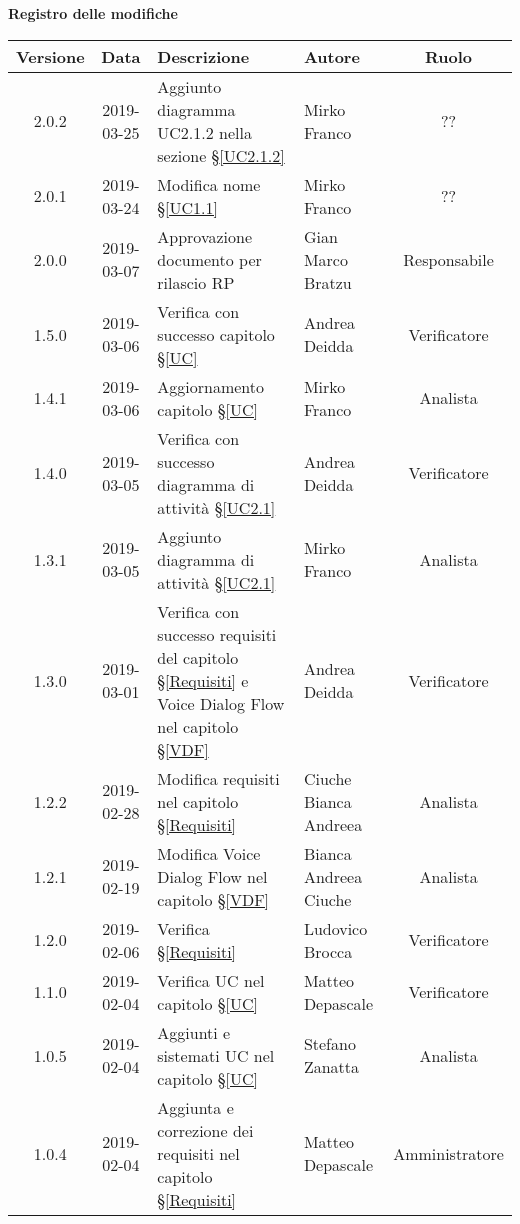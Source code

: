 	\begin{center}
		\textbf{Registro delle modifiche}
	\end{center}
	\begin{center}
		\begin{tabularx}{\textwidth}{|c|c|X|X|c|}
			\hline
			\textbf{Versione} & \textbf{Data} & \textbf{Descrizione} & \textbf{Autore} & \textbf{Ruolo} \\
			\hline
			2.0.2 & 2019-03-25 & Aggiunto diagramma UC2.1.2 nella sezione \S\ref{UC2.1.2} & Mirko Franco & ?? \\
			\hline
			2.0.1 & 2019-03-24 & Modifica nome \S\ref{UC1.1} & Mirko Franco & ?? \\
			\hline
			2.0.0 & 2019-03-07 & Approvazione documento per rilascio RP & Gian Marco Bratzu & Responsabile \\
			\hline
			1.5.0 & 2019-03-06 & Verifica con successo capitolo \S\ref{UC} &Andrea Deidda & Verificatore \\
			\hline
			1.4.1 & 2019-03-06 & Aggiornamento capitolo \S\ref{UC} & Mirko Franco & Analista \\
			\hline
			1.4.0 & 2019-03-05 & Verifica con successo diagramma di attività \S\ref{UC2.1} & Andrea Deidda & Verificatore \\
			\hline
			1.3.1 & 2019-03-05 & Aggiunto diagramma di attività \S\ref{UC2.1} & Mirko Franco & Analista \\
			\hline
			1.3.0 & 2019-03-01 & Verifica con successo requisiti del capitolo \S\ref{Requisiti} e Voice Dialog Flow nel capitolo \S\ref{VDF} & Andrea Deidda & Verificatore \\
			\hline
			1.2.2 & 2019-02-28 & Modifica requisiti nel capitolo \S\ref{Requisiti}& Ciuche Bianca Andreea & Analista \\
			\hline
			1.2.1 & 2019-02-19 & Modifica Voice Dialog Flow  nel capitolo \S\ref{VDF} & Bianca Andreea Ciuche & Analista  \\
			\hline
			1.2.0 & 2019-02-06 & Verifica \S\ref{Requisiti}& Ludovico Brocca & Verificatore \\
			\hline
			1.1.0 & 2019-02-04 & Verifica UC nel capitolo \S\ref{UC}& Matteo Depascale & Verificatore\\
			\hline
			1.0.5 & 2019-02-04 & Aggiunti e sistemati UC nel capitolo \S\ref{UC}& Stefano Zanatta & Analista\\
			\hline
			1.0.4 & 2019-02-04 & Aggiunta e correzione dei requisiti nel capitolo \S\ref{Requisiti}& Matteo Depascale & Amministratore\\

\end{tabularx}
\end{center}
